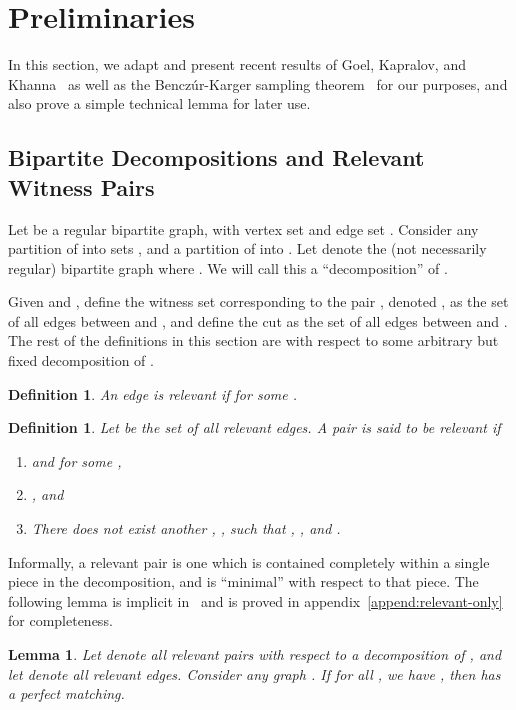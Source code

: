 \documentclass[11pt]{article}
\newtheorem{lemma}[theorem]{Lemma}
\newtheorem{definition}[theorem]{Definition}
\begin{document}
\section{Preliminaries}
\label{sec:prelim}

In this section, we adapt and present recent results of Goel, Kapralov, and
Khanna~\cite{gkk:rbp08} as well as the Bencz\'{u}r-Karger sampling
theorem~\cite{benczurkarger96} for our purposes, and also prove a simple
technical lemma for later use.
\subsection{Bipartite Decompositions and Relevant Witness Pairs}
\label{sec:define}
Let  be a regular bipartite graph, with vertex set  and
edge set . Consider any partition of  into  sets
, and a partition of  into . Let  denote the (not necessarily regular) bipartite graph  where . We will call this a
``decomposition'' of . 

Given  and , define the witness set corresponding
to the pair , denoted , as the set of all edges between  and
, and define the cut  as the set of all edges between  and . The rest of the definitions
in this section are with respect to some arbitrary but fixed decomposition of
.

\begin{definition}
  An edge  is relevant if  for some .
\end{definition}

\begin{definition}
  Let  be the set of all relevant edges. A pair  is said to be
  relevant if
  \begin{enumerate}
  \item  and  for some ,
  \item , and
  \item There does not exist another , , such that
    , , and .
  \end{enumerate}
\end{definition}

Informally, a relevant pair is one which is contained completely within a
single piece in the decomposition, and is ``minimal'' with respect to that
piece. The following lemma is implicit in~\cite{gkk:rbp08} and is proved in
appendix~\ref{append:relevant-only} for completeness.
\begin{lemma}
\label{lem:relevant-only}
  Let  denote all relevant pairs  with respect to a
  decomposition of , and let  denote all relevant edges. Consider any
  graph . If for all , we have , then  has a perfect matching.
\end{lemma}
\end{document}
